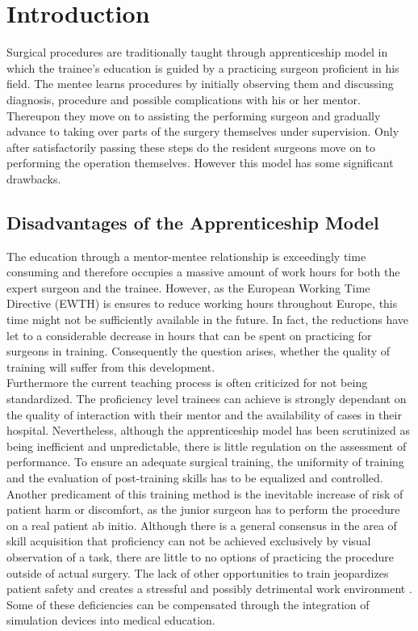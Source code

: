 \chapter{Introduction}\label{chapter:introduction}

Surgical procedures are traditionally taught through apprenticeship model in which the trainee’s education is guided by a practicing surgeon proficient in his field. The mentee learns procedures by initially observing them and discussing diagnosis, procedure and possible complications with his or her mentor. Thereupon they move on to assisting the performing surgeon and gradually advance to taking over parts of the surgery themselves under supervision. Only after satisfactorily passing these steps do the resident surgeons move on to performing the operation themselves. However this model has some significant drawbacks. 

\section{Disadvantages of the Apprenticeship Model}

The education through a mentor-mentee relationship is exceedingly time consuming and therefore occupies a massive amount of work hours for both the expert surgeon and the trainee. However, as the European Working Time Directive (EWTH) is ensures to reduce working hours throughout Europe, this time might not be sufficiently available in the future\parencite{pandey_workshops_2005}. In fact, the reductions have let to a considerable decrease in hours that can be spent on practicing for surgeons in training\parencite{johnson_development_2011}. Consequently the question arises, whether the quality of training will suffer from this development. \\ 
Furthermore the current teaching process is often criticized for not being standardized. The proficiency level trainees can achieve is strongly dependant on the quality of interaction with their mentor and the availability of cases in their hospital. Nevertheless, although the apprenticeship model has been scrutinized as being inefficient and unpredictable, there is little regulation on the assessment of performance. To ensure an adequate surgical training, the uniformity of training and the evaluation of post-training skills has to be equalized and controlled\parencite{johnson_virtual_2012}\parencite{bismuth_incorporating_2010}. \\
Another predicament of this training method is the inevitable increase of risk of patient harm or discomfort, as the junior surgeon has to perform the procedure on a real patient ab initio. Although there is a general consensus in the area of skill acquisition that proficiency can not be achieved exclusively by visual observation of a task, there are little to no options of practicing the procedure outside of actual surgery. The lack of other opportunities to train jeopardizes patient safety and creates a stressful and possibly detrimental work environment\parencite{johnson_development_2011} \parencite{pandey_workshops_2005}. \\
Some of these deficiencies can be compensated through the integration of simulation devices into medical education. 

